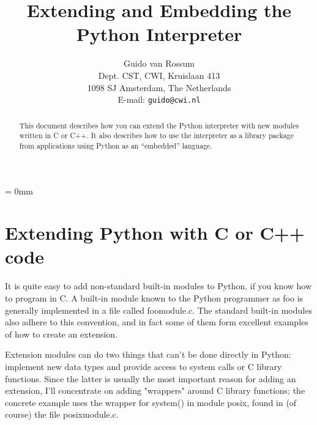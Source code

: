 
\title{\bf Extending and Embedding the Python Interpreter}

\author{
	Guido van Rossum \\
	Dept. CST, CWI, Kruislaan 413 \\
	1098 SJ Amsterdam, The Netherlands \\
	E-mail: {\tt guido@cwi.nl}
}

\makeindex




\maketitle

\begin{abstract}

\noindent
This document describes how you can extend the Python interpreter with
new modules written in C or C++.  It also describes how to use the
interpreter as a library package from applications using Python as an
``embedded'' language.

\end{abstract}

\pagebreak

{
\parskip = 0mm
\tableofcontents
}

\pagebreak


\chapter{Extending Python with C or C++ code}

It is quite easy to add non-standard built-in modules to Python, if
you know how to program in C.  A built-in module known to the Python
programmer as foo is generally implemented in a file called
foomodule.c.  The standard built-in modules also adhere to this
convention, and in fact some of them form excellent examples of how to
create an extension.

Extension modules can do two things that can't be done directly in
Python: implement new data types and provide access to system calls or
C library functions.  Since the latter is usually the most important
reason for adding an extension, I'll concentrate on adding "wrappers"
around C library functions; the concrete example uses the wrapper for
system() in module posix, found in (of course) the file posixmodule.c.

